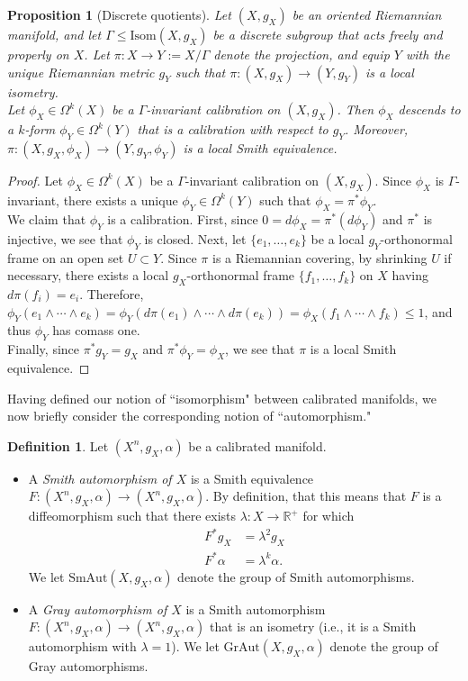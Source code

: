 \documentclass[11pt]{article}
\newcommand{\R}{\mathbb{R}}
\newtheorem{prop}[thm]{Proposition}
\theoremstyle{definition}
\newtheorem{defn}[thm]{Definition}
\numberwithin{equation}{section}
\begin{document}
\begin{prop}[Discrete quotients] \label{prop:Discrete} Let $(X, g_X)$ be an oriented Riemannian manifold, and let $\Gamma \leq \mathrm{Isom}(X, g_X)$ be a discrete subgroup that acts freely and properly on $X$.  Let $\pi \colon X \to Y := X/\Gamma$ denote the projection, and equip $Y$ with the unique Riemannian metric $g_Y$ such that $\pi \colon (X, g_X) \to (Y, g_Y)$ is a local isometry.  \\
\indent Let $\phi_X \in \Omega^k(X)$ be a $\Gamma$-invariant calibration on $(X, g_X)$.  Then $\phi_X$ descends to a $k$-form $\phi_Y \in \Omega^k(Y)$ that is a calibration with respect to $g_Y$.  Moreover, $\pi \colon (X, g_X, \phi_X) \to (Y, g_Y, \phi_Y)$ is a local Smith equivalence.
\end{prop}

\begin{proof} Let $\phi_X \in \Omega^k(X)$ be a $\Gamma$-invariant calibration on $(X, g_X)$.  Since $\phi_X$ is $\Gamma$-invariant, there exists a unique $\phi_Y \in \Omega^k(Y)$ such that $\phi_X = \pi^*\phi_Y$. \\
\indent We claim that $\phi_Y$ is a calibration.  First, since $0 = d\phi_X = \pi^*(d\phi_Y)$ and $\pi^*$ is injective, we see that $\phi_Y$ is closed.  Next, let $\{e_1, \ldots, e_k\}$ be a local $g_Y$-orthonormal frame on an open set $U \subset Y$.  Since $\pi$ is a Riemannian covering, by shrinking $U$ if necessary, there exists a local $g_X$-orthonormal frame $\{f_1, \ldots, f_k\}$ on $X$ having $d\pi(f_i) = e_i$.  Therefore, $\phi_Y(e_1 \wedge \cdots \wedge e_k) = \phi_Y(d\pi(e_1) \wedge \cdots \wedge d\pi(e_k)) = \phi_X(f_1 \wedge \cdots \wedge f_k) \leq 1$, and thus $\phi_Y$ has comass one. \\
\indent Finally, since $\pi^*g_Y = g_X$ and $\pi^*\phi_Y = \phi_X$, we see that $\pi$ is a local Smith equivalence.
\end{proof}

\indent Having defined our notion of ``isomorphism" between calibrated manifolds, we now briefly consider the corresponding notion of ``automorphism."

\begin{defn} Let $(X^n, g_X, \alpha)$ be a calibrated manifold.
\begin{itemize}
\item A \emph{Smith automorphism of $X$} is a Smith equivalence $F \colon (X^n, g_X, \alpha) \to (X^n, g_X, \alpha)$.  By definition, that this means that $F$ is a diffeomorphism such that there exists $\lambda \colon X \to \R^+$ for which
\begin{align*}
F^*g_X & = \lambda^2 g_X \\
F^*\alpha & = \lambda^k \alpha.
\end{align*}
We let $\mathrm{SmAut}(X, g_X, \alpha)$ denote the group of Smith automorphisms.
\item  A \emph{Gray automorphism of $X$} is a Smith automorphism $F \colon (X^n, g_X, \alpha) \to (X^n, g_X, \alpha)$ that is an isometry (i.e., it is a Smith automorphism with $\lambda = 1$).  We let $\mathrm{GrAut}(X, g_X, \alpha)$ denote the group of Gray automorphisms.
\end{itemize}
\end{defn}
\end{document}
